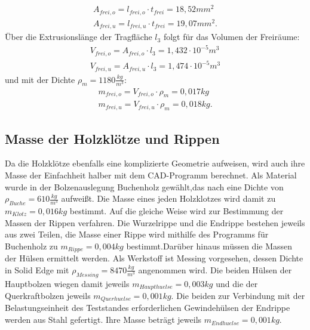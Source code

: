 \begin{equation}
\begin{array}{l}
		A_{frei,o}=l_{frei,o}\cdot t_{frei}=18,52mm^{2} \\
		A_{frei,u}=l_{frei,u}\cdot t_{frei}=19,07mm^{2}.
\end{array}
\end{equation}
Über die Extrusionslänge der Tragfläche $ l_{3} $ folgt für das Volumen der Freiräume:
\begin{equation}
	\begin{array}{l}
		V_{frei,o}=A_{frei,o}\cdot l_{3}= 1,432\cdot 10^{-5}m^{3} \\
		V_{frei,u}=A_{frei,u}\cdot l_{3}= 1,474\cdot 10^{-5}m^{3} 
	\end{array}
\end{equation}
und mit der Dichte $ \rho_{m}=1180\frac{kg}{m^{3}} $:
\begin{equation}
	\begin{array}{l}
		m_{frei,o}=V_{frei,o}\cdot \rho_{m}=0,017kg\\
		m_{frei,u}=V_{frei,u}\cdot \rho_{m}=0,018kg.
	\end{array}
\end{equation}

\subsection{Masse der Holzklötze und Rippen}
Da die Holzklötze ebenfalls eine komplizierte Geometrie aufweisen, wird auch ihre Masse der Einfachheit halber mit dem CAD-Programm berechnet. Als Material wurde in der Bolzenauslegung Buchenholz gewählt,das nach \cite{item19} eine Dichte von $ \rho_{Buche}=610\frac{kg}{m^{3}} $ aufweißt. Die Masse eines jeden Holzklotzes wird damit zu $ m_{Klotz}=0,016kg $ bestimmt.
Auf die gleiche Weise wird zur Bestimmung der Massen der Rippen verfahren. Die Wurzelrippe und die Endrippe bestehen jeweils aus zwei Teilen, die Masse einer Rippe wird mithilfe des Programms für Buchenholz zu $ m_{Rippe}=0,004kg $ bestimmt.Darüber hinaus müssen die Massen der Hülsen ermittelt werden. Als Werkstoff ist Messing vorgesehen, dessen Dichte in Solid Edge mit $ \rho_{Messing}=8470\frac{kg}{m^{3}} $ angenommen wird. Die beiden Hülsen der Hauptbolzen wiegen damit jeweils $ m_{Haupthuelse}=0,003kg $ und die der Querkraftbolzen jeweils $ m_{Querhuelse}=0,001kg $. Die beiden zur Verbindung mit der Belastungseinheit des Teststandes erforderlichen Gewindehülsen der Endrippe werden aus Stahl gefertigt. Ihre Masse beträgt jeweils $ m_{Endhuelse}=0,001kg $.

